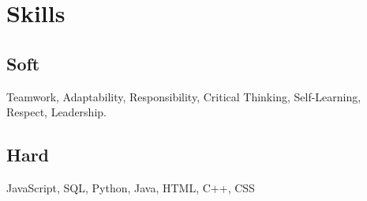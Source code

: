 \section*{Skills}

\subsection*{Soft}
Teamwork, Adaptability, Responsibility, Critical Thinking, Self-Learning, Respect, Leadership. \\

\subsection*{Hard}
JavaScript, SQL, Python, Java, HTML, C++, CSS %
\\
